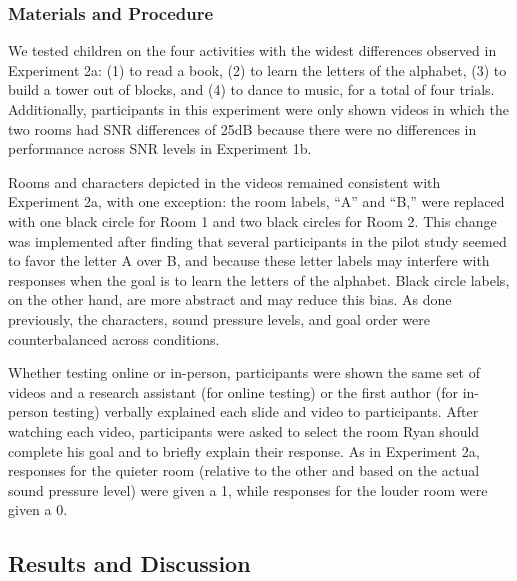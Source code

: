 \documentclass[10pt, letterpaper]{article}
\begin{document}
\hypertarget{materials-and-procedure-3}{%
\subsubsection{Materials and
Procedure}\label{materials-and-procedure-3}}

We tested children on the four activities with the widest differences
observed in Experiment 2a: (1) to read a book, (2) to learn the letters
of the alphabet, (3) to build a tower out of blocks, and (4) to dance to
music, for a total of four trials. Additionally, participants in this
experiment were only shown videos in which the two rooms had SNR
differences of 25dB because there were no differences in performance
across SNR levels in Experiment 1b.

Rooms and characters depicted in the videos remained consistent with
Experiment 2a, with one exception: the room labels, ``A'' and ``B,''
were replaced with one black circle for Room 1 and two black circles for
Room 2. This change was implemented after finding that several
participants in the pilot study seemed to favor the letter A over B, and
because these letter labels may interfere with responses when the goal
is to learn the letters of the alphabet. Black circle labels, on the
other hand, are more abstract and may reduce this bias. As done
previously, the characters, sound pressure levels, and goal order were
counterbalanced across conditions.

Whether testing online or in-person, participants were shown the same
set of videos and a research assistant (for online testing) or the first
author (for in-person testing) verbally explained each slide and video
to participants. After watching each video, participants were asked to
select the room Ryan should complete his goal and to briefly explain
their response. As in Experiment 2a, responses for the quieter room
(relative to the other and based on the actual sound pressure level)
were given a 1, while responses for the louder room were given a 0.

\hypertarget{results-and-discussion-3}{%
\subsection{Results and Discussion}\label{results-and-discussion-3}}
\end{document}
